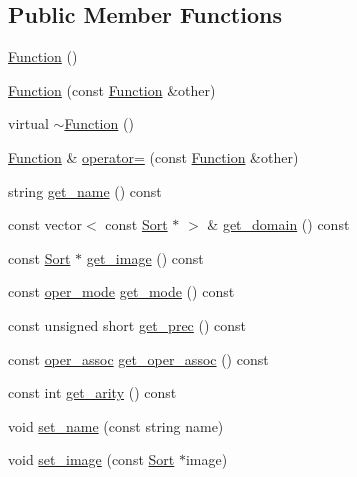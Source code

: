 \subsection*{Public Member Functions}
\begin{DoxyCompactItemize}
\item 
\hyperlink{classgenevalmag_1_1Function_a88af7b2a3947048e53e0bc9c1d071ad9}{Function} ()
\item 
\hyperlink{classgenevalmag_1_1Function_ae598ad6ba742b5d73567c41c3cd4d7bd}{Function} (const \hyperlink{classgenevalmag_1_1Function}{Function} \&other)
\item 
virtual \hyperlink{classgenevalmag_1_1Function_a318a1979861665429179979f9d678f3e}{$\sim$Function} ()
\item 
\hyperlink{classgenevalmag_1_1Function}{Function} \& \hyperlink{classgenevalmag_1_1Function_a917f09b6aa99038bcae21de7e9e99ad1}{operator=} (const \hyperlink{classgenevalmag_1_1Function}{Function} \&other)
\item 
string \hyperlink{classgenevalmag_1_1Function_aec65653267a5d4cb93f2ce7b5e1c542b}{get\_\-name} () const 
\item 
const vector$<$ const \hyperlink{classgenevalmag_1_1Sort}{Sort} $\ast$ $>$ \& \hyperlink{classgenevalmag_1_1Function_acffc8f2df4197f05e095bc427fb13331}{get\_\-domain} () const 
\item 
const \hyperlink{classgenevalmag_1_1Sort}{Sort} $\ast$ \hyperlink{classgenevalmag_1_1Function_a3a0dc4e1734623f53021f0b647c3b0cc}{get\_\-image} () const 
\item 
const \hyperlink{namespacegenevalmag_a8e412eca3897f0532c6f1997af777ba4}{oper\_\-mode} \hyperlink{classgenevalmag_1_1Function_a6db7c2695f9cce41c24e5cfea7406dd6}{get\_\-mode} () const 
\item 
const unsigned short \hyperlink{classgenevalmag_1_1Function_a31272821c5ad532ada3b3d8a988f5891}{get\_\-prec} () const 
\item 
const \hyperlink{namespacegenevalmag_aed96782841eb4586b9e32ce72721d64b}{oper\_\-assoc} \hyperlink{classgenevalmag_1_1Function_ae3338db71a289ae4649936bea49dfa5f}{get\_\-oper\_\-assoc} () const 
\item 
const int \hyperlink{classgenevalmag_1_1Function_a30fc3347320a9cbeb37b8d45aac3737e}{get\_\-arity} () const 
\item 
void \hyperlink{classgenevalmag_1_1Function_a09a0403fa5eac256e223802d6328041e}{set\_\-name} (const string name)
\item 
void \hyperlink{classgenevalmag_1_1Function_ab82067b5dfd6d143a12defbf6eb52d56}{set\_\-image} (const \hyperlink{classgenevalmag_1_1Sort}{Sort} $\ast$image)

\end{DoxyCompactItemize}
